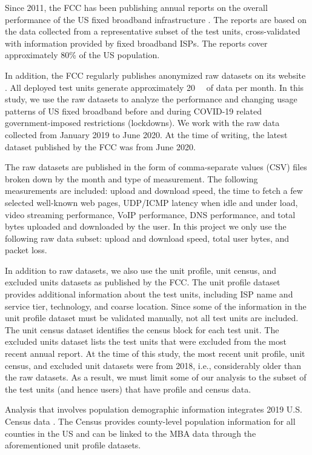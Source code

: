 \documentclass[conference,10pt]{IEEEtran}
\begin{document}
Since 2011, the FCC has been publishing annual reports on the overall performance of the US fixed broadband infrastructure \cite{mba-studies}. The reports are based on the data collected from a representative subset of the test units, cross-validated with information provided by fixed broadband ISPs. The reports cover approximately 80\% of the US population.

In addition, the FCC regularly publishes anonymized raw datasets on its website \cite{data}. All deployed test units generate approximately \SI{20}{\giga\byte} of data per month. In this study, we use the raw datasets to analyze the performance and changing usage patterns of US fixed broadband before and during COVID-19 related government-imposed restrictions (lockdowns). We work with the raw data collected from January 2019 to June 2020. At the time of writing, the latest dataset published by the FCC was from June 2020.

The raw datasets are published in the form of comma-separate values (CSV) files broken down by the month and type of measurement. The following measurements are included: upload and download speed, the time to fetch a few selected well-known web pages, UDP/ICMP latency when idle and under load, video streaming performance, VoIP performance, DNS performance, and total bytes uploaded and downloaded by the user. In this project we only use the following raw data subset: upload and download speed, total user bytes, and packet loss.

In addition to raw datasets, we also use the unit profile, unit census, and excluded units datasets as published by the FCC. The unit profile dataset provides additional information about the test units, including ISP name and service tier, technology, and coarse location. Since some of the information in the unit profile dataset must be validated manually, not all test units are included. The unit census dataset identifies the census block for each test unit. The excluded units dataset lists the test units that were excluded from the most recent annual report. At the time of this study, the most recent unit profile, unit census, and excluded unit datasets were from 2018, i.e., considerably older than the raw datasets. As a result, we must limit some of our analysis to the subset of the test units (and hence users) that have profile and census data.

Analysis that involves population demographic information integrates 2019 U.S. Census data \cite{census}. The Census provides county-level population information for all counties in the US and can be linked to the MBA data through the aforementioned unit profile datasets.
\end{document}
